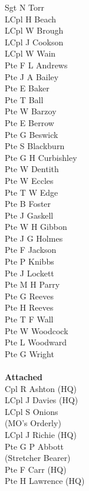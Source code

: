 \begin{multicols}{3}
  Sgt N Torr \\
  LCpl H Beach \\
  LCpl W Brough \\
  LCpl J Cookson \\
  LCpl W Wain \\
  Pte F L Andrews \\
  Pte J A Bailey \\
  Pte E Baker \\
  Pte T Ball \\
  Pte W Barzoy \\
  Pte E Berrow \\
  Pte G Beswick \\
  Pte S Blackburn \\
  Pte G H Curbishley \\
  Pte W Dentith \\
  Pte W Eccles \\
  Pte T W Edge \\
  Pte B Foster \\
  Pte J Gaskell \\
  Pte W H Gibbon \\
  Pte J G Holmes \\
  Pte F Jackson \\
  Pte P Knibbs \\
  Pte J Lockett \\
  Pte M H Parry \\
  Pte G Reeves \\
  Pte H Reeves \\
  Pte T F Wall \\
  Pte W Woodcock \\
  Pte L Woodward \\
  Pte G Wright \\
  \\
  \textbf{Attached} \\
  Cpl R Ashton (HQ) \\
  LCpl J Davies (HQ) \\
  LCpl S Onions \\ \indent (MO's Orderly) \\
  LCpl J Richie (HQ) \\
  Pte G P Abbott \\ \indent (Stretcher Bearer) \\
  Pte F Carr (HQ) \\
  Pte H Lawrence (HQ) \\
\end{multicols}

